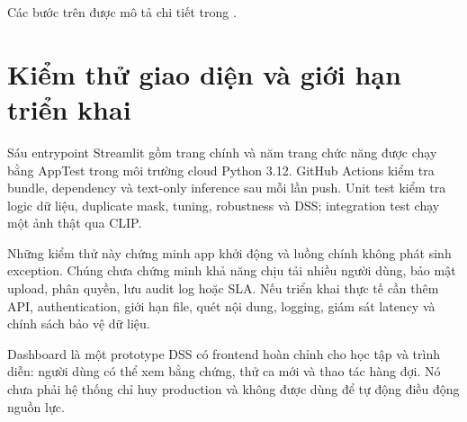 Các bước trên được mô tả chi tiết trong .

\section{Kiểm thử giao diện và giới hạn triển khai}

Sáu entrypoint Streamlit gồm trang chính và năm trang chức năng được chạy bằng
AppTest trong môi trường cloud Python 3.12. GitHub Actions kiểm tra bundle,
dependency và text-only inference sau mỗi lần push. Unit test kiểm tra logic
dữ liệu, duplicate mask, tuning, robustness và DSS; integration test chạy một
ảnh thật qua CLIP.

Những kiểm thử này chứng minh app khởi động và luồng chính không phát sinh
exception. Chúng chưa chứng minh khả năng chịu tải nhiều người dùng, bảo mật
upload, phân quyền, lưu audit log hoặc SLA. Nếu triển khai thực tế cần thêm API,
authentication, giới hạn file, quét nội dung, logging, giám sát latency và chính
sách bảo vệ dữ liệu.

\begin{insight}
Dashboard là một prototype DSS có frontend hoàn chỉnh cho học tập và trình diễn:
người dùng có thể xem bằng chứng, thử ca mới và thao tác hàng đợi. Nó chưa phải
hệ thống chỉ huy production và không được dùng để tự động điều động nguồn lực.
\end{insight}
